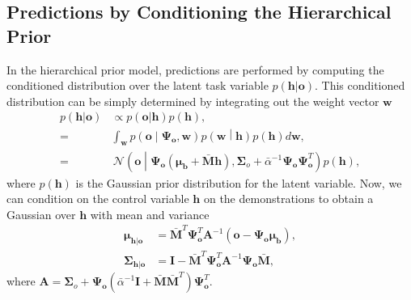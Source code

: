 \documentclass[letterpaper, 10 pt, conference]{ieeeconf}  %
\newcommand{\N}{\ensuremath{\mathcal{N}}}
\renewcommand{\vec}[1]{\ensuremath{\boldsymbol{#1}}}
\newcommand{\w}{\ensuremath{\vec w }}
\newcommand{\Vwo}{\ensuremath{\vec \mu_{\vec b} }}
\newcommand{\VWV}{\ensuremath{\bar{\vec M} }}
\newcommand{\ValphaN}{\ensuremath{\bar{\alpha} }}
\begin{document}
\subsection{Predictions by Conditioning the Hierarchical Prior}

In the hierarchical prior model, predictions are performed by computing the conditioned distribution over the latent task variable $p(\vec h| \vec o)$. 
This conditioned distribution can be simply determined by integrating out the 
weight vector $\w$
\begin{align*}
p(\vec h| \vec o) &\propto p(\vec o|\vec h) p(\vec h), \\
 =& \int_{\vec w} p\left(\vec o\middle|\vec \Psi_{\vec o}, \vec w\right)
    p\left(\vec w\middle|\vec h\right) p(\vec h) d\vec w, \\
 =& \, \N\left(\vec o\middle|\vec \Psi_{\vec o}\left(\Vwo + \VWV \vec h\right),
    \boldsymbol{\Sigma}_o  + \ValphaN^{-1} \vec \Psi_{\vec o} \vec \Psi_{\vec
    o}^T\right) p(\vec h),
\end{align*}
where $p(\vec h)$ is the Gaussian prior distribution for the latent variable. 
Now, we can condition on the control variable $\vec h$ on the demonstrations to obtain a Gaussian over $\vec h$ with mean and variance
\begin{align}
 \boldsymbol{\mu}_{\vec h| \vec o} &= \VWV^T \boldsymbol{\Psi}_{\vec o}^T  \vec
    A^{-1} \left(\vec o - \boldsymbol{\Psi}_{\vec o} \Vwo \right), \label{eq:mu_o_single} \\
 \boldsymbol{\Sigma}_{\vec h|\vec o} &= \vec I - \VWV^T \boldsymbol{\Psi}_{\vec o}^T \vec A^{-1} \boldsymbol{\Psi}_{\vec o} \VWV , \label{eq:sigma_o_single}
\end{align}
where $\vec A = \boldsymbol{\Sigma}_o + \boldsymbol{\Psi}_{\vec o}
\left(\ValphaN^{-1} \vec I + \VWV \VWV^T \right) \boldsymbol{\Psi}_{\vec o}^T$. 
\end{document}
